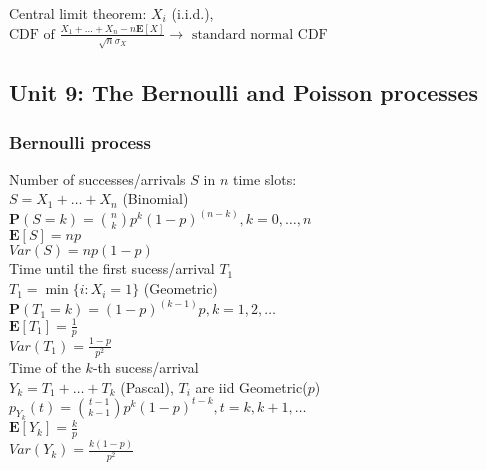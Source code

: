 Central limit theorem: $X_i$ (i.i.d.), $\text{CDF of }\frac{X_1 + \ldots + X_n - n\mathbf{E}[X]}{\sqrt{n}\sigma_X} \rightarrow \text{ standard normal CDF}$


\subsection*{Unit 9: The Bernoulli and Poisson processes}


\subsubsection*{Bernoulli process} 

Number of successes/arrivals $S$ in $n$ time slots:\\
$S = X_1 + \ldots + X_n$ (Binomial)\\
$\mathbf{P}(S=k) = {n \choose k} p^k (1-p)^(n-k), k=0,\ldots,n$\\
$\mathbf{E}[S] = np$\\
$Var(S) = np(1-p)$\\

Time until the first sucess/arrival $T_1$\\
$T_1 = \min\lbrace i: X_i = 1\rbrace$ (Geometric)\\
$\mathbf{P}(T_1=k) = (1-p)^(k-1)p, k=1,2,\ldots$\\
$\mathbf{E}[T_1] = \frac{1}{p}$\\
$Var(T_1) = \frac{1-p}{p^2}$\\

Time of the $k$-th sucess/arrival\\
$Y_k = T_1 + \ldots + T_k$ (Pascal), $T_i$ are iid Geometric($p$)\\
$p_{Y_k}(t) = {t-1 \choose k-1} p^k (1-p)^{t-k}, t=k, k+1, \ldots$\\
$\mathbf{E}[Y_k] = \frac{k}{p}$\\
$Var(Y_k) = \frac{k(1-p)}{p^2}$\\

